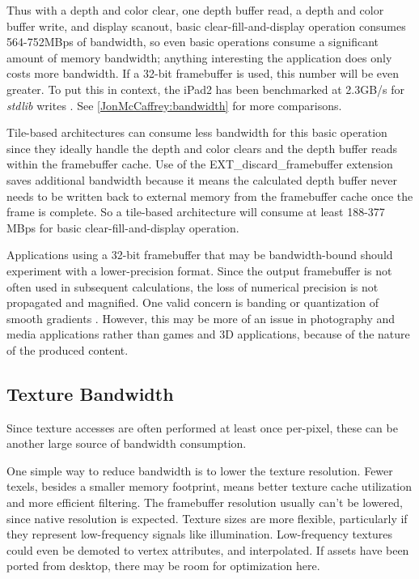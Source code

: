 
 Thus with a depth and color clear, one depth buffer read, a depth and color
 buffer write, and display scanout, basic clear-fill-and-display operation
 consumes 564-752MBps of bandwidth, so even basic operations consume a
 significant amount of memory bandwidth; anything interesting the application
 does only costs more bandwidth. If a 32-bit framebuffer is used, this number
 will be even greater.  To put this in context, the iPad2 has been benchmarked
 at 2.3GB/s for \textit{stdlib} writes \cite{Shimpi11}.  See
 \ref{JonMcCaffrey:bandwidth} for more comparisons.

 Tile-based architectures can consume less bandwidth for this basic operation
 since they ideally handle the depth and color clears and the depth buffer
 reads within the framebuffer cache.  Use of the
 EXT\_discard\_framebuffer\cite{EXT_discard_framebuffer} extension saves
 additional bandwidth because it means the calculated depth buffer never needs
 to be written back to external memory from the framebuffer cache once the
 frame is complete. So a tile-based architecture will consume at least 188-377
 MBps for basic clear-fill-and-display operation.


Applications using a 32-bit framebuffer that may be bandwidth-bound should
experiment with a lower-precision format.  Since the output framebuffer is not
often used in subsequent calculations, the loss of numerical precision is not
propagated and magnified.  One valid concern is banding or quantization of
smooth gradients \cite{Guy10}.  However, this may be more of an issue in
photography and media applications rather than games and 3D applications,
because of the nature of the produced content.

\subsection{Texture Bandwidth}\label{JonMcCaffrey-Texture-Bandwidth} Since
texture accesses are often performed at least once per-pixel, these can be
another large source of bandwidth consumption.


One simple way to reduce bandwidth is to lower the texture resolution.  Fewer
texels, besides a smaller memory footprint, means better texture cache
utilization and more efficient filtering.  The framebuffer resolution usually
can't be lowered, since native resolution is expected.  Texture sizes are more
flexible, particularly if they represent low-frequency signals like
illumination.  Low-frequency textures could even be demoted to vertex
attributes, and interpolated.  If assets have been ported from desktop, there
may be room for optimization here.

